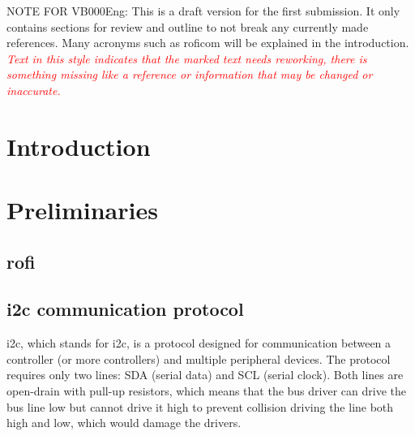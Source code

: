 \documentclass[
  digital,     %
  oneside,     %
  nosansbold,  %
  nocolorbold, %
  nolof,         %
  nolot,         %
]{fithesis4}
\newcommand{\TODO}[1]{\textcolor{red}{\textit{#1}}}
\begin{document}
NOTE FOR VB000Eng: This is a draft version for the first submission. It only contains sections for review and outline to not break any currently made references. Many acronyms such as \acrshort{roficom} will be explained in the introduction.
\TODO{Text in this style indicates that the marked text needs reworking, there is something missing like a reference or information that may be changed or inaccurate.}
\clearpage
\printnoidxglossary[title={Abbreviations}, type=\acronymtype]
\printnoidxglossary[title={Glossary}]

\chapter{Introduction}

\chapter{Preliminaries}

\section[ RoFI ]{ \acrshort{rofi} }

\section[Inter-Integrated Circuit communication protocol]{\acrlong{i2c} communication protocol} \label{i2c}
\acrshort{i2c}, which stands for \acrlong{i2c}, is a protocol designed for communication between a controller (or more controllers) and multiple peripheral devices. The protocol requires only two lines: SDA (serial data) and SCL (serial clock). Both lines are open-drain with pull-up resistors, which means that the bus driver can drive the bus line low but cannot drive it high to prevent collision driving the line both high and low, which would damage the drivers.
\end{document}
